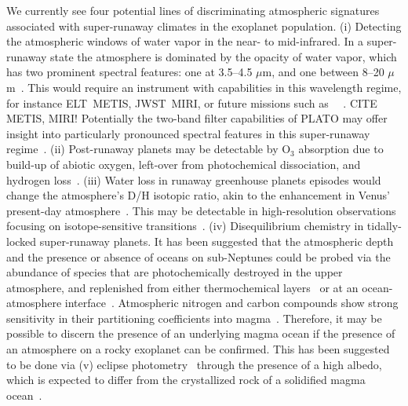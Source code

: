 \documentclass[twocolumn,twocolappendix]{aastex631}
\begin{document}
We currently see four potential lines of discriminating atmospheric signatures associated with super-runaway climates in the exoplanet population.
(i) Detecting the atmospheric windows of water vapor in the near- to mid-infrared.
In a super-runaway state the atmosphere is dominated by the opacity of water vapor, which has two prominent spectral features: one at 3.5--4.5 $\mu$m, and one between 8--20 $\mu$m~\citep[e.g.][]{Boukrouche2021}.
This would require an instrument with capabilities in this wavelength regime, for instance ELT~METIS, JWST~MIRI, or future missions such as \life\ ~\citep{2019A&A...621A.125B,2022A&A...664A..21Q,2022A&A...664A..22D}. CITE METIS, MIRI!
Potentially the two-band filter capabilities of PLATO may offer insight into particularly pronounced spectral features in this super-runaway regime~\citep{2020SSRv..216...98G}.
(ii) Post-runaway planets may be detectable by O$_{3}$ absorption due to build-up of abiotic oxygen, left-over from photochemical dissociation, and hydrogen loss~\citep{2014ApJ...785L..20W,Luger2015}.
(iii) Water loss in runaway greenhouse planets episodes would change the atmosphere's D/H isotopic ratio, akin to the enhancement in Venus' present-day atmosphere~\citep{2019JGRE..124.2015K,2021JGRE..12606643K}.
This may be detectable in high-resolution observations focusing on isotope-sensitive transitions~\citep{2019AJ....158...26L,2019A&A...622A.139M}.
(iv) Disequilibrium chemistry in tidally-locked super-runaway planets.
It has been suggested that the atmospheric depth and the presence or absence of oceans on sub-Neptunes could be probed via the abundance of species that are photochemically destroyed in the upper atmosphere, and replenished from either thermochemical layers~\citep{2021ApJ...914...38Y,2021ApJ...922L..27T} or at an ocean-atmosphere interface~\citep{2019ApJ...887..231L,2021ApJ...921L...8H}.
Atmospheric nitrogen and carbon compounds show strong sensitivity in their partitioning coefficients into magma~\citep{2022E&PSL.59817847G,2022PSJ.....3...93B}.
Therefore, it may be possible to discern the presence of an underlying magma ocean if the presence of an atmosphere on a rocky exoplanet can be confirmed.
This has been suggested to be done via (v) eclipse photometry~\citep{2019ApJ...886..141M,2019ApJ...886..140K} through the presence of a high albedo, which is expected to differ from the crystallized rock of a solidified magma ocean~\citep{2020ApJ...898..160E,Fortin2022}.
\end{document}
